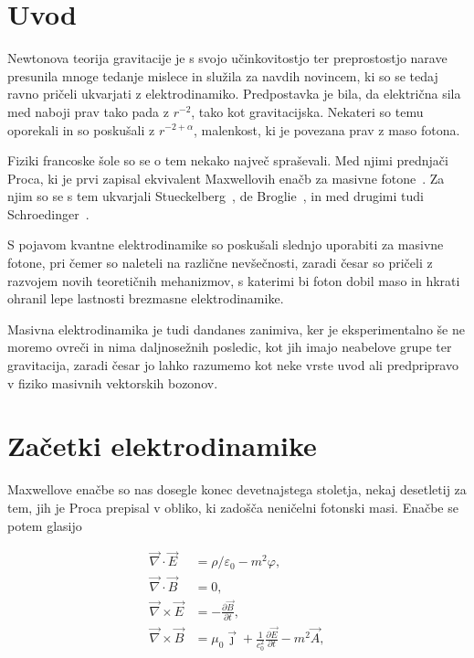 \documentclass[a4paper, twocolumn, titlepage]{article}
\newcommand{\parc}[2]{
	\ensuremath{\frac{\partial#1}{\partial#2}}
}
\newcommand{\rot}{
	\ensuremath{\vec{\nabla}\times}
}
\renewcommand{\div}{
	\ensuremath{\vec{\nabla}\cdot}
}
\newcommand{\ve}{
	\ensuremath{\vec{E}}
}
\newcommand{\vb}{
	\ensuremath{\vec{B}}
}
\begin{document}

\pagebreak

\section{Uvod}

Newtonova teorija gravitacije je s svojo učinkovitostjo ter preprostostjo narave presunila mnoge tedanje mislece in
služila za navdih novincem, ki so se tedaj ravno pričeli ukvarjati z elektrodinamiko. Predpostavka je bila, da
električna sila med naboji prav tako pada z $r^{-2}$, tako kot gravitacijska. Nekateri so temu oporekali in so
poskušali z $r^{-2 + \alpha}$, malenkost, ki je povezana prav z maso fotona.~\cite{nieto2}

Fiziki francoske šole so se o tem nekako največ spraševali. Med njimi prednjači Proca, ki je prvi zapisal ekvivalent
Maxwellovih enačb za masivne fotone~\cite{nieto1,over}. Za njim so se s tem ukvarjali Stueckelberg~\cite{over,nieto1},
de Broglie~\cite{nieto1,over}, in med drugimi tudi Schroedinger~\cite{nieto1}.

S pojavom kvantne elektrodinamike so poskušali slednjo uporabiti za masivne fotone, pri čemer so naleteli na
različne nevšečnosti, zaradi česar so pričeli z razvojem novih teoretičnih mehanizmov, s katerimi bi foton dobil maso
in hkrati ohranil lepe lastnosti brezmasne elektrodinamike.

Masivna elektrodinamika je tudi dandanes zanimiva, ker je eksperimentalno še ne moremo ovreči in nima daljnosežnih
posledic, kot jih imajo neabelove grupe ter gravitacija, zaradi česar jo lahko razumemo kot neke vrste uvod ali
predpripravo v fiziko masivnih vektorskih bozonov.

\section{Začetki elektrodinamike}

Maxwellove enačbe so nas dosegle konec devetnajstega stoletja, nekaj desetletij za tem, jih je Proca prepisal v obliko,
ki zado\v s\v ca neni\v celni fotonski masi. Ena\v cbe se potem glasijo

\begin{align}
	\div\ve &= \rho/\varepsilon_0 - m^2\varphi, \label{proca1} \\
	\div\vb &= 0, \label{proca2} \\
	\rot\ve &= -\parc{\vb}{t}, \label{proca3} \\
	\rot\vb &= \mu_0\vec{\jmath} + \frac{1}{c_0^2}\parc{\ve}{t} - m^2\vec{A}, \label{proca4}
\end{align}
\end{document}

